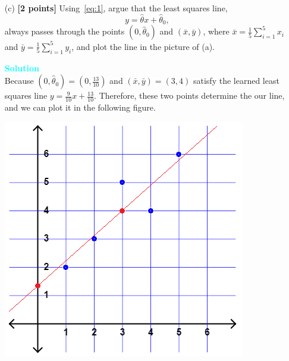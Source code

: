 \documentclass[10pt]{article}
\newenvironment{solution}
    { \begin{mdframed}[backgroundcolor=gray!10] \textcolor{cyan}{\textbf{Solution}} \\}
    {  \end{mdframed}}
\begin{document}
\begin{enumerate}
\begin{itemize}
\begin{solution}
			            $\hat{\theta} = \frac{9}{10}, \ \hat{\theta}_0 = \frac{13}{10}$: \\
			            By setting the derivative of the objective function w.r.t. $\theta$ and $\theta_0$ equal to 0, we have
			            \begin{align}
				            \hat{\theta}     & = \tfrac{\sum_{i=1}^{n}(x_{i}-\bar{x})(y_{i}-\bar{y})}{\sum_{i=1}^{n}(x_{i}-\bar{x})^{2}}, \\
				            \hat{\theta}_{0} & = \bar{y} -\hat{\theta}\bar{x},
			            \end{align}
			            where $\bar{x} = \tfrac{1}{n}\sum_{i=1}^{n}x_{i} = 3$ and $\bar{y} = \tfrac{1}{n}\sum_{i=1}^{n} y_{i} = 4$.
			            Then, substituting the 5 data points into the above solutions, immediately leads to our solution.
		            \end{solution}
		      \item[(c)] \textbf{[2 points]} Using~\eqref{eq:1}, argue that the least squares line,
		            \begin{equation}
			            y = \hat{\theta}x + \hat{\theta}_0,
		            \end{equation}
		            always passes through the points $(0,\hat{\theta}_0)$ and $(\bar{x},\bar{y})$,
		            where $\bar{x} = \tfrac{1}{5}\sum_{i=1}^{5}x_{i}$ and $\bar{y} = \tfrac{1}{5}\sum_{i=1}^{5} y_{i}$, and plot the line in the picture of (a).
		            \begin{solution}
			            Because $(0,\hat{\theta}_0) = (0,\frac{13}{10})$ and $(\bar{x},\bar{y})=(3,4)$ satisfy the learned least squares line $y = \frac{9}{10} x + \frac{13}{10}$.
			            Therefore, these two points determine the our line, and we can plot it in the following figure.
			            \begin{center}
				            \includegraphics[width=.6\linewidth]{c_sol2.png}

\end{center}
\end{solution}
\end{itemize}
\end{enumerate}
\end{document}
